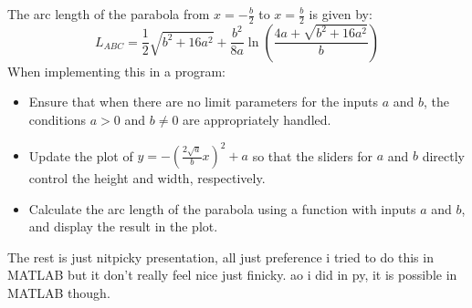 \documentclass[a4paper, 12pt]{report}
\begin{document}
    The arc length of the parabola from $x = -\frac{b}{2}$ to $x = \frac{b}{2}$ is given by:
    \[L_{ABC} = \frac{1}{2}\sqrt{b^2 + 16a^2} + \frac{b^2}{8a}\ln\left(\frac{4a + \sqrt{b^2 + 16a^2}}{b}\right)\]
    When implementing this in a program:
    \begin{itemize}[itemsep=-0.1cm]
        \item Ensure that when there are no limit parameters for the inputs \(a\) and \(b\), the conditions \(a > 0\) and \(b \neq 0\) are appropriately handled.
        \item Update the plot of \(y = -\left(\frac{2\sqrt{a}}{b}x\right)^2 + a\) so that the sliders for \(a\) and \(b\) directly control the height and width, respectively.
        \item Calculate the arc length of the parabola using a function with inputs \(a\) and \(b\), and display the result in the plot.
    \end{itemize}
    \raggedright
    
    The rest is just nitpicky presentation, all just preference i tried to do this in MATLAB but it don't really feel nice just finicky. ao i did in py, it is possible in MATLAB though.
    \newpage
    
    \centering
    
\end{document}
